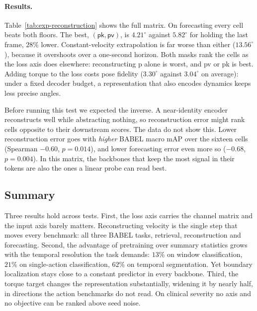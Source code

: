 \paragraph{Results.} Table~\ref{tab:exp-reconstruction} shows the full matrix. On
forecasting every cell beats both floors. The best, $(\textsf{pk},\textsf{pv})$, is
$4.21^\circ$ against $5.82^\circ$ for holding the last frame, $28\%$ lower. Constant-velocity
extrapolation is far worse than either ($13.56^\circ$), because it overshoots over a
one-second horizon. Both masks rank the cells as the loss axis does elsewhere:
reconstructing \textsf{p} alone is worst, and \textsf{pv} or \textsf{pk} is best. Adding
torque to the loss costs pose fidelity ($3.30^\circ$ against $3.04^\circ$ on average):
under a fixed decoder budget, a representation that also encodes dynamics keeps less
precise angles.

Before running this test we expected the inverse. A near-identity encoder reconstructs well
while abstracting nothing, so reconstruction error might rank cells opposite to their
downstream scores. The data do not show this. Lower reconstruction error goes with
\emph{higher} BABEL macro mAP over the sixteen cells (Spearman $-0.60$, $p=0.014$), and
lower forecasting error even more so ($-0.68$, $p=0.004$). In this matrix, the backbones
that keep the most signal in their tokens are also the ones a linear probe can read best.

\subsection{Summary}
\label{sec:exp-summary}

Three results hold across tests. First, the loss axis carries the channel matrix and the
input axis barely matters. Reconstructing velocity is the single step that moves every
benchmark: all three BABEL tasks, retrieval, reconstruction and forecasting. Second, the
advantage of pretraining over summary statistics grows with the temporal resolution the
task demands: $13\%$ on window classification, $21\%$ on single-action classification, $62\%$ on
temporal segmentation. Yet
boundary localization stays close to a constant predictor in every backbone. Third, the
torque target changes the representation substantially, widening it by nearly half, in
directions the action benchmarks do not read. On clinical severity no axis and no objective
can be ranked above seed noise.
